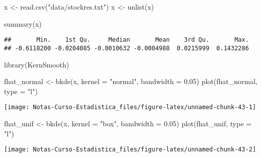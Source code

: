\documentclass[
  12pt,
]{book}
\newenvironment{Shaded}{\begin{snugshade}}{\end{snugshade}}
\newcommand{\AttributeTok}[1]{\textcolor[rgb]{0.77,0.63,0.00}{#1}}
\newcommand{\FloatTok}[1]{\textcolor[rgb]{0.00,0.00,0.81}{#1}}
\newcommand{\FunctionTok}[1]{\textcolor[rgb]{0.00,0.00,0.00}{#1}}
\newcommand{\NormalTok}[1]{#1}
\newcommand{\OtherTok}[1]{\textcolor[rgb]{0.56,0.35,0.01}{#1}}
\newcommand{\StringTok}[1]{\textcolor[rgb]{0.31,0.60,0.02}{#1}}
\theoremstyle{definition}
\theoremstyle{definition}
\theoremstyle{definition}
\theoremstyle{definition}
\theoremstyle{remark}
\begin{document}
\begin{Shaded}
\begin{Highlighting}[]
\NormalTok{x }\OtherTok{\textless{}{-}} \FunctionTok{read.csv}\NormalTok{(}\StringTok{"data/stockres.txt"}\NormalTok{)}
\NormalTok{x }\OtherTok{\textless{}{-}} \FunctionTok{unlist}\NormalTok{(x)}
\end{Highlighting}
\end{Shaded}

\begin{Shaded}
\begin{Highlighting}[]
\FunctionTok{summary}\NormalTok{(x)}
\end{Highlighting}
\end{Shaded}

\begin{verbatim}
##       Min.    1st Qu.     Median       Mean    3rd Qu.       Max. 
## -0.6118200 -0.0204085 -0.0010632 -0.0004988  0.0215999  0.1432286
\end{verbatim}

\begin{Shaded}
\begin{Highlighting}[]
\FunctionTok{library}\NormalTok{(KernSmooth)}

\NormalTok{fhat\_normal }\OtherTok{\textless{}{-}} \FunctionTok{bkde}\NormalTok{(x, }\AttributeTok{kernel =} \StringTok{"normal"}\NormalTok{, }\AttributeTok{bandwidth =} \FloatTok{0.05}\NormalTok{)}
\FunctionTok{plot}\NormalTok{(fhat\_normal, }\AttributeTok{type =} \StringTok{"l"}\NormalTok{)}
\end{Highlighting}
\end{Shaded}

\begin{center}\texttt{[image: Notas-Curso-Estadistica\_files/figure-latex/unnamed-chunk-43-1]} \end{center}

\begin{Shaded}
\begin{Highlighting}[]
\NormalTok{fhat\_unif }\OtherTok{\textless{}{-}} \FunctionTok{bkde}\NormalTok{(x, }\AttributeTok{kernel =} \StringTok{"box"}\NormalTok{, }\AttributeTok{bandwidth =} \FloatTok{0.05}\NormalTok{)}
\FunctionTok{plot}\NormalTok{(fhat\_unif, }\AttributeTok{type =} \StringTok{"l"}\NormalTok{)}
\end{Highlighting}
\end{Shaded}

\begin{center}\texttt{[image: Notas-Curso-Estadistica\_files/figure-latex/unnamed-chunk-43-2]} \end{center}
\end{document}

